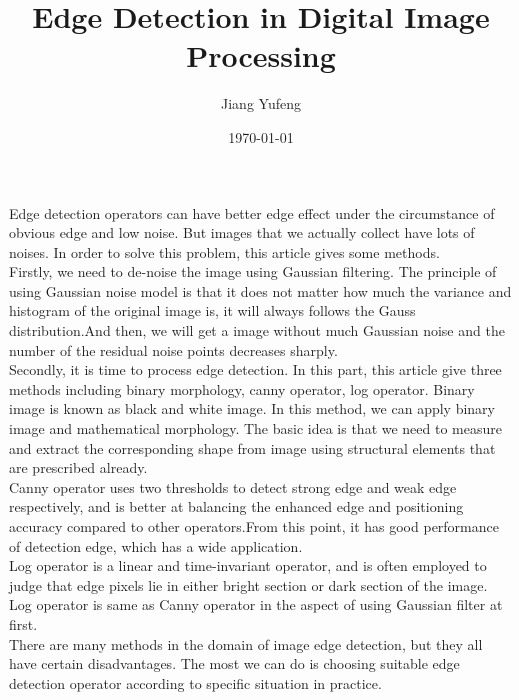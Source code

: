 \documentclass[11pt, oneside]{article}
\title{Edge Detection in Digital Image Processing}
\author{Jiang Yufeng}
\date{\today}
\begin{document}
\maketitle
Edge detection operators can have better edge effect under the circumstance of obvious edge and low noise. But images that we actually collect have lots of noises. In order to solve this problem, this article gives some methods. \\
\indent Firstly, we need to de-noise the image using Gaussian filtering. The principle of using Gaussian noise model is that it does not matter how much the variance and histogram of the original image is, it will always follows the Gauss distribution.And then, we will get a image without much Gaussian noise and the number of the residual noise points decreases sharply.\\
\indent Secondly, it is time to process edge detection. In this part, this article give three methods including binary morphology, canny operator, log operator.  Binary image is known as black and white image. In this method, we can apply binary image and mathematical morphology.  The basic idea is that we need to measure and extract the corresponding shape from image using structural elements that are prescribed already.\\
\indent Canny operator uses two thresholds to detect strong edge and weak edge respectively, and is better at balancing the enhanced edge and positioning accuracy compared to other operators.From this point, it has good performance of detection edge, which has a wide application.\\
\indent Log operator is a linear and time-invariant operator, and is often employed to judge that edge pixels lie in either bright section or dark section of the image. Log operator is same as Canny operator in the aspect of using Gaussian filter at first.\\
\indent There are many methods in the domain of image edge detection, but they all have certain disadvantages. The most we can do is choosing suitable edge detection operator according to specific situation in practice.
\end{document}
